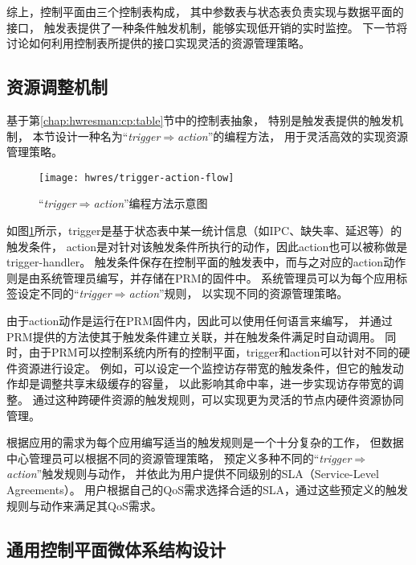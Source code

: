 综上，控制平面由三个控制表构成，
其中参数表与状态表负责实现与数据平面的接口，
触发表提供了一种条件触发机制，能够实现低开销的实时监控。
下一节将讨论如何利用控制表所提供的接口实现灵活的资源管理策略。


\subsection{资源调整机制}

基于第\ref{chap:hwresman:cp:table}节中的控制表抽象，
特别是触发表提供的触发机制，
本节设计一种名为``\emph{trigger$\Rightarrow$action}''的编程方法，
用于灵活高效的实现资源管理策略。

\begin{figure}[htb]
  \centering
  \texttt{[image: hwres/trigger-action-flow]}
  \caption{``\emph{trigger$\Rightarrow$action}''编程方法示意图}
  \label{fig:trigger-action-flow}
\end{figure}

如图\ref{fig:trigger-action-flow}所示，trigger是基于状态表中某一统计信息（如IPC、缺失率、延迟等）的触发条件，
action是对针对该触发条件所执行的动作，因此action也可以被称做是trigger-handler。
触发条件保存在控制平面的触发表中，而与之对应的action动作则是由系统管理员编写，并存储在PRM的固件中。
系统管理员可以为每个应用标签设定不同的``\emph{trigger$\Rightarrow$action}''规则，
以实现不同的资源管理策略。

由于action动作是运行在PRM固件内，因此可以使用任何语言来编写，
并通过PRM提供的方法使其于触发条件建立关联，并在触发条件满足时自动调用。
同时，由于PRM可以控制系统内所有的控制平面，trigger和action可以针对不同的硬件资源进行设定。
例如，可以设定一个监控访存带宽的触发条件，但它的触发动作却是调整共享末级缓存的容量，
以此影响其命中率，进一步实现访存带宽的调整。
通过这种跨硬件资源的触发规则，可以实现更为灵活的节点内硬件资源协同管理。

根据应用的需求为每个应用编写适当的触发规则是一个十分复杂的工作，
但数据中心管理员可以根据不同的资源管理策略，
预定义多种不同的``\emph{trigger$\Rightarrow$action}''触发规则与动作，
并依此为用户提供不同级别的SLA（Service-Level Agreements）。
用户根据自己的QoS需求选择合适的SLA，通过这些预定义的触发规则与动作来满足其QoS需求。


\subsection{通用控制平面微体系结构设计}
\label{chap:hwresman:cp:uarch}

